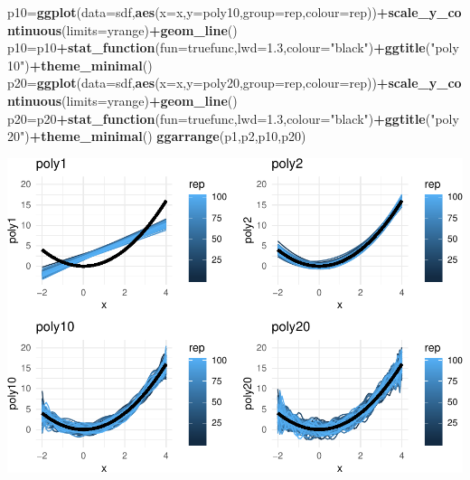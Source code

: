 \documentclass[]{article}
\newenvironment{Shaded}{\begin{snugshade}}{\end{snugshade}}
\newcommand{\KeywordTok}[1]{\textcolor[rgb]{0.13,0.29,0.53}{\textbf{#1}}}
\newcommand{\DataTypeTok}[1]{\textcolor[rgb]{0.13,0.29,0.53}{#1}}
\newcommand{\FloatTok}[1]{\textcolor[rgb]{0.00,0.00,0.81}{#1}}
\newcommand{\StringTok}[1]{\textcolor[rgb]{0.31,0.60,0.02}{#1}}
\newcommand{\OperatorTok}[1]{\textcolor[rgb]{0.81,0.36,0.00}{\textbf{#1}}}
\newcommand{\NormalTok}[1]{#1}
\begin{document}
\begin{Shaded}
\begin{Highlighting}[]
\NormalTok{p10=}\KeywordTok{ggplot}\NormalTok{(}\DataTypeTok{data=}\NormalTok{sdf,}\KeywordTok{aes}\NormalTok{(}\DataTypeTok{x=}\NormalTok{x,}\DataTypeTok{y=}\NormalTok{poly10,}\DataTypeTok{group=}\NormalTok{rep,}\DataTypeTok{colour=}\NormalTok{rep))}\OperatorTok{+}\KeywordTok{scale_y_continuous}\NormalTok{(}\DataTypeTok{limits=}\NormalTok{yrange)}\OperatorTok{+}\KeywordTok{geom_line}\NormalTok{()}
\NormalTok{p10=p10}\OperatorTok{+}\KeywordTok{stat_function}\NormalTok{(}\DataTypeTok{fun=}\NormalTok{truefunc,}\DataTypeTok{lwd=}\FloatTok{1.3}\NormalTok{,}\DataTypeTok{colour=}\StringTok{"black"}\NormalTok{)}\OperatorTok{+}\KeywordTok{ggtitle}\NormalTok{(}\StringTok{"poly10"}\NormalTok{)}\OperatorTok{+}\KeywordTok{theme_minimal}\NormalTok{()}
\NormalTok{p20=}\KeywordTok{ggplot}\NormalTok{(}\DataTypeTok{data=}\NormalTok{sdf,}\KeywordTok{aes}\NormalTok{(}\DataTypeTok{x=}\NormalTok{x,}\DataTypeTok{y=}\NormalTok{poly20,}\DataTypeTok{group=}\NormalTok{rep,}\DataTypeTok{colour=}\NormalTok{rep))}\OperatorTok{+}\KeywordTok{scale_y_continuous}\NormalTok{(}\DataTypeTok{limits=}\NormalTok{yrange)}\OperatorTok{+}\KeywordTok{geom_line}\NormalTok{()}
\NormalTok{p20=p20}\OperatorTok{+}\KeywordTok{stat_function}\NormalTok{(}\DataTypeTok{fun=}\NormalTok{truefunc,}\DataTypeTok{lwd=}\FloatTok{1.3}\NormalTok{,}\DataTypeTok{colour=}\StringTok{"black"}\NormalTok{)}\OperatorTok{+}\KeywordTok{ggtitle}\NormalTok{(}\StringTok{"poly20"}\NormalTok{)}\OperatorTok{+}\KeywordTok{theme_minimal}\NormalTok{()}
\KeywordTok{ggarrange}\NormalTok{(p1,p2,p10,p20)}
\end{Highlighting}
\end{Shaded}

\includegraphics{RecEx2-sol_files/figure-latex/unnamed-chunk-12-1.pdf}
\end{document}
